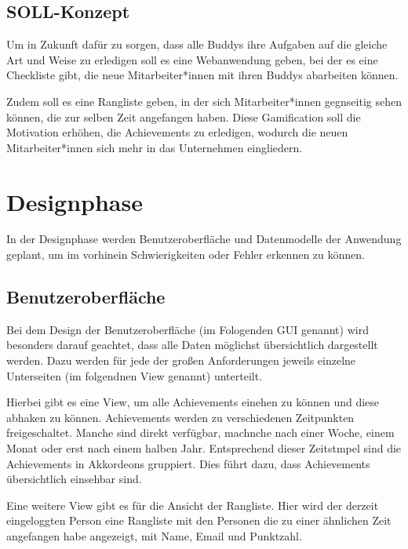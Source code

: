 \documentclass[12pt]{article}
\begin{document}
\subsection{SOLL-Konzept}

Um in Zukunft dafür zu sorgen, dass alle Buddys ihre Aufgaben auf die gleiche Art
und Weise zu erledigen soll es eine Webanwendung geben, bei der es eine Checkliste gibt,
die neue Mitarbeiter*innen mit ihren Buddys abarbeiten können.

Zudem soll es eine Rangliste geben, in der sich Mitarbeiter*innen gegnseitig
sehen können, die zur selben Zeit angefangen haben. Diese Gamification soll
die Motivation erhöhen, die Achievements zu erledigen, wodurch die neuen
Mitarbeiter*innen sich mehr in das Unternehmen eingliedern.


%
%

\section{Designphase}
In der Designphase werden Benutzeroberfläche und Datenmodelle der Anwendung geplant, um im
vorhinein Schwierigkeiten oder Fehler erkennen zu können. 

\subsection{Benutzeroberfläche}

Bei dem Design der Benutzeroberfläche (im Fologenden GUI genannt) wird
besonders darauf geachtet, dass alle Daten möglichst übersichtlich
dargestellt werden. Dazu werden für jede der großen Anforderungen
jeweils einzelne Unterseiten (im folgendnen View genannt) unterteilt. 

Hierbei gibt es eine View, um alle Achievements einehen zu können
und diese abhaken zu können. Achievements werden zu verschiedenen
Zeitpunkten freigeschaltet. Manche sind direkt verfügbar, machnche 
nach einer Woche, einem Monat oder erst nach einem halben Jahr. 
Entsprechend dieser Zeitstmpel sind die Achievements in Akkordeons
gruppiert. Dies führt dazu, dass Achievements übersichtlich einsehbar
sind.

Eine weitere View gibt es für die Ansicht der Rangliste. Hier wird
der derzeit eingeloggten Person eine Rangliste mit den Personen die
zu einer ähnlichen Zeit angefangen habe angezeigt, mit Name, Email 
und Punktzahl.
\end{document}
